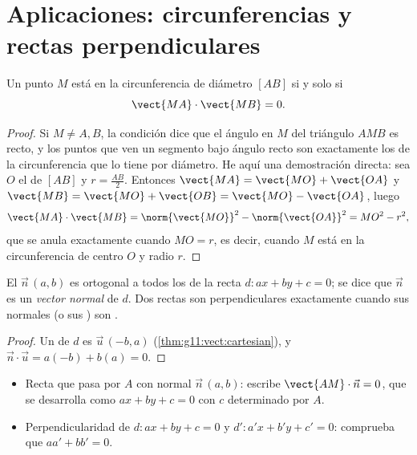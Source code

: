 \section{Aplicaciones: circunferencias y rectas perpendiculares}

\begin{proposition}\label{prop:g11:scal:diameter}
Un punto $M$ está en la circunferencia de diámetro $[AB]$ si y solo si
\[
\vect{MA} \cdot \vect{MB} = 0 .
\]
\end{proposition}

\begin{proof}
Si $M \neq A, B$, la condición dice que el ángulo en $M$ del triángulo
$AMB$ es recto, y los puntos que ven un segmento bajo ángulo recto son
exactamente los de la circunferencia que lo tiene por diámetro. He aquí
una demostración directa: sea $O$ el  de $[AB]$ y
$r = \frac{AB}{2}$. Entonces $\vect{MA} = \vect{MO} + \vect{OA}$ y
$\vect{MB} = \vect{MO} + \vect{OB} = \vect{MO} - \vect{OA}$, luego
\[
\vect{MA}\cdot\vect{MB}
= \norm{\vect{MO}}^2 - \norm{\vect{OA}}^2 = MO^2 - r^2,
\]
que se anula exactamente cuando $MO = r$, es decir, cuando $M$ está en la
circunferencia de centro $O$ y radio $r$.
\end{proof}

\begin{proposition}\label{prop:g11:scal:normal}
El  $\vec n\,(a, b)$ es ortogonal a todos los  de
la recta $d : ax + by + c = 0$; se dice que $\vec n$ es un \emph{vector
normal} de $d$. Dos rectas son perpendiculares
exactamente cuando sus  normales (o sus ) son
.
\end{proposition}

\begin{proof}
Un  de $d$ es $\vec u\,(-b, a)$
(\cref{thm:g11:vect:cartesian}), y
$\vec n \cdot \vec u = a(-b) + b(a) = 0$.
\end{proof}

\begin{method}\label{met:g11:scal:normal}
\begin{itemize}
  \item Recta que pasa por $A$ con normal $\vec n\,(a,b)$: escribe
        $\vect{AM} \cdot \vec n = 0$, que se desarrolla como
        $ax + by + c = 0$ con $c$ determinado por $A$.
  \item Perpendicularidad de $d: ax+by+c = 0$ y $d': a'x+b'y+c' = 0$:
        comprueba que $aa' + bb' = 0$.
\end{itemize}
\end{method}

